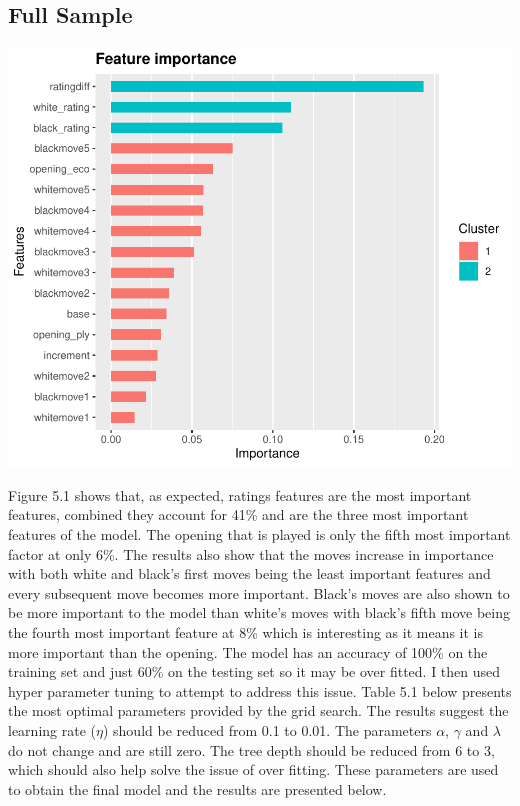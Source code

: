 \documentclass[12pt,preprint, authoryear]{elsarticle}
\let\origfigure\figure
\let\endorigfigure\endfigure
\renewenvironment{figure}[1][2] {
    \expandafter\origfigure\expandafter[H]
} {
    \endorigfigure
}
\numberwithin{equation}{section}
\numberwithin{figure}{section}
\numberwithin{table}{section}
\begin{document}
\hypertarget{full-sample}{%
\subsection{Full Sample}\label{full-sample}}

\begin{figure}[H]

{\centering \includegraphics{WriteUp_files/figure-latex/importfull1-1} 

}

\caption{Importance of Features for Untuned Model: Full Sample\label{Figure8}}\label{fig:importfull1}
\end{figure}

Figure 5.1 shows that, as expected, ratings features are the most
important features, combined they account for 41\% and are the three
most important features of the model. The opening that is played is only
the fifth most important factor at only 6\%. The results also show that
the moves increase in importance with both white and black's first moves
being the least important features and every subsequent move becomes
more important. Black's moves are also shown to be more important to the
model than white's moves with black's fifth move being the fourth most
important feature at 8\% which is interesting as it means it is more
important than the opening. The model has an accuracy of 100\% on the
training set and just 60\% on the testing set so it may be over fitted.
I then used hyper parameter tuning to attempt to address this issue.
Table 5.1 below presents the most optimal parameters provided by the
grid search. The results suggest the learning rate (\(\eta\)) should be
reduced from 0.1 to 0.01. The parameters \(\alpha\), \(\gamma\) and
\(\lambda\) do not change and are still zero. The tree depth should be
reduced from 6 to 3, which should also help solve the issue of over
fitting. These parameters are used to obtain the final model and the
results are presented below.
\end{document}
